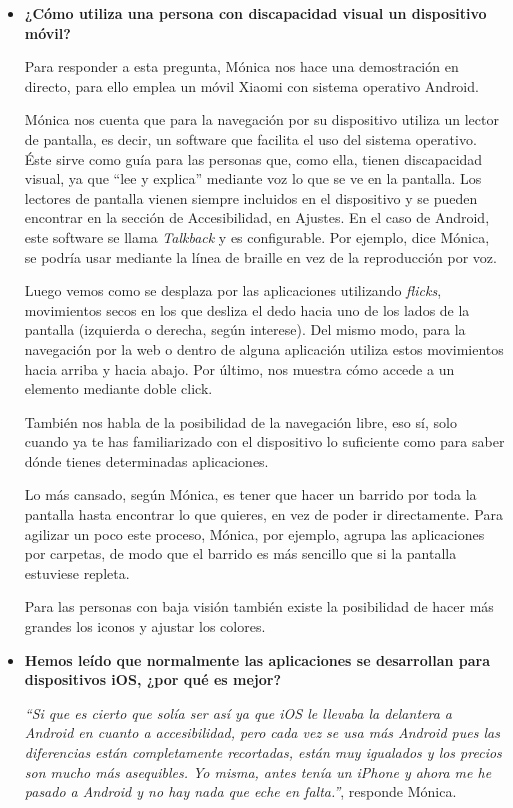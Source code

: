 \begin{itemize}
	\item  \textbf{¿Cómo utiliza una persona con discapacidad visual un dispositivo móvil?}
	
	Para responder a esta pregunta, Mónica nos hace una demostración en directo, para ello emplea un móvil Xiaomi con sistema operativo Android.
	
	Mónica nos cuenta que para la navegación por su dispositivo utiliza un lector de pantalla, es decir, un software que facilita el uso del sistema operativo. Éste sirve como guía para las personas que, como ella, tienen discapacidad visual, ya que ``lee y explica'' mediante voz lo que se ve en la pantalla. Los lectores de pantalla vienen siempre incluidos en el dispositivo y se pueden encontrar en la sección de Accesibilidad, en Ajustes. En el caso de Android, este software se llama \textit{Talkback} y es configurable. Por ejemplo, dice Mónica, se podría usar mediante la línea de braille en vez de la reproducción por voz.
	
	Luego vemos como se desplaza por las aplicaciones utilizando \textit{flicks}, movimientos secos en los que desliza el dedo hacia uno de los lados de la pantalla (izquierda o derecha, según interese). Del mismo modo, para la navegación por la web o dentro de alguna aplicación utiliza estos movimientos hacia arriba y hacia abajo. Por último, nos muestra cómo accede a un elemento mediante doble click. 

	También nos habla de la posibilidad de la navegación libre, eso sí, solo cuando ya te has familiarizado con el dispositivo lo suficiente como para saber dónde tienes determinadas aplicaciones. 

	Lo más cansado, según Mónica, es tener que hacer un barrido por toda la pantalla hasta encontrar lo que quieres, en vez de poder ir directamente. Para agilizar un poco este proceso, Mónica, por ejemplo, agrupa las aplicaciones por carpetas, de modo que el barrido es más sencillo que si la pantalla estuviese repleta.
	
	Para las personas con baja visión también existe la posibilidad de hacer más grandes los iconos y ajustar los colores.
	
	\item \textbf{Hemos leído que normalmente las aplicaciones se desarrollan para dispositivos iOS, ¿por qué es mejor?} 
	
	\textit{``Si que es cierto que solía ser así ya que iOS le llevaba la delantera a Android en cuanto a accesibilidad, pero cada vez se usa más Android pues las diferencias están completamente recortadas, están muy igualados y los precios son mucho más asequibles. Yo misma, antes tenía un iPhone y ahora me he pasado a Android y no hay nada que eche en falta.''}, responde Mónica.
	

\end{itemize}
